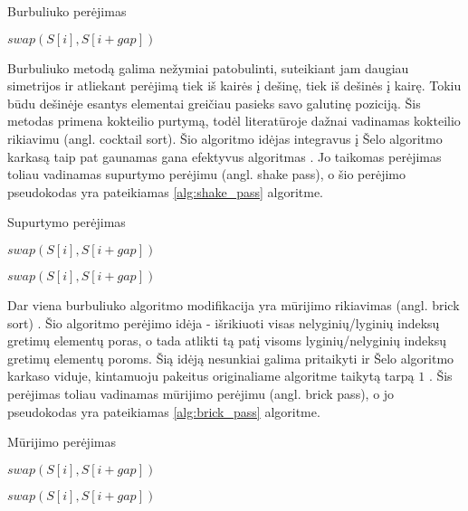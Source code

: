 \documentclass{VUMIFInfBakalaurinis}
\begin{document}
\begin{algorithm}[H]
  \caption{Burbuliuko perėjimas}\label{alg:bubble_pass}
  \begin{algorithmic}[1]
        \State $swap(S[i], S[i+gap])$
      \EndIf
    \EndFor
  \end{algorithmic}
\end{algorithm}

Burbuliuko metodą galima nežymiai patobulinti, suteikiant jam daugiau simetrijos ir atliekant perėjimą
tiek iš kairės į dešinę, tiek iš dešinės į kairę.
Tokiu būdu dešinėje esantys elementai greičiau pasieks savo galutinę poziciją.
Šis metodas primena kokteilio purtymą, todėl literatūroje dažnai vadinamas kokteilio rikiavimu (angl. cocktail sort).
Šio algoritmo idėjas integravus į Šelo algoritmo karkasą taip pat gaunamas gana efektyvus algoritmas \cite{incerpi1986practical}.
Jo taikomas perėjimas toliau vadinamas supurtymo perėjimu (angl. shake pass), o šio perėjimo pseudokodas yra pateikiamas \ref{alg:shake_pass} algoritme.

\begin{algorithm}[H]
  \caption{Supurtymo perėjimas}\label{alg:shake_pass}
  \begin{algorithmic}[1]
        \State $swap(S[i], S[i+gap])$
      \EndIf
    \EndFor

        \State $swap(S[i], S[i+gap])$
      \EndIf
    \EndFor
  \end{algorithmic}
\end{algorithm}

Dar viena burbuliuko algoritmo modifikacija yra mūrijimo rikiavimas (angl. brick sort) \cite{habermann1972parallel}.
Šio algoritmo perėjimo idėja - išrikiuoti visas nelyginių/lyginių indeksų gretimų elementų poras,
o tada atlikti tą patį visoms lyginių/nelyginių indeksų gretimų elementų poroms.
Šią idėją nesunkiai galima pritaikyti ir Šelo algoritmo karkaso viduje, kintamuoju pakeitus originaliame algoritme taikytą tarpą $1$ \cite{lemke1994performance}.
Šis perėjimas toliau vadinamas mūrijimo perėjimu (angl. brick pass), o jo pseudokodas yra pateikiamas \ref{alg:brick_pass} algoritme.

\begin{algorithm}[H]
  \caption{Mūrijimo perėjimas}\label{alg:brick_pass}
  \begin{algorithmic}[1]
        \State $swap(S[i], S[i+gap])$
      \EndIf
    \EndFor

        \State $swap(S[i], S[i+gap])$
      \EndIf
    \EndFor
  \end{algorithmic}
\end{algorithm}
\end{document}
